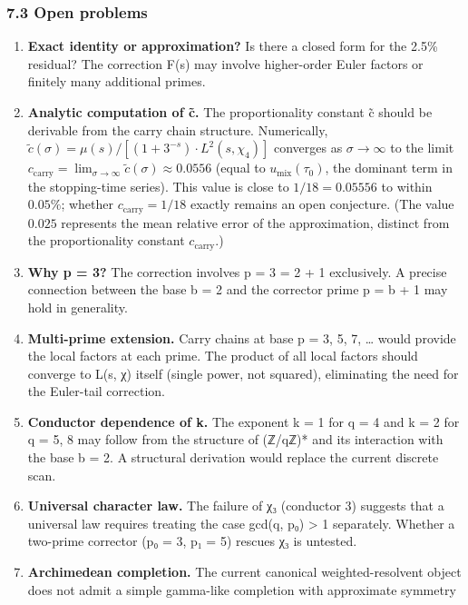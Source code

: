 \documentclass[
  11pt,
]{article}
\begin{document}
\subsubsection{7.3 Open problems}\label{open-problems}

\begin{enumerate}
\def\labelenumi{\arabic{enumi}.}
\item
  \textbf{Exact identity or approximation?} Is there a closed form for the 2.5\%
  residual? The correction F(s) may involve higher-order Euler factors or
  finitely many additional primes.
\item
  \textbf{Analytic computation of c̃.} The proportionality constant c̃ should be
  derivable from the carry chain structure. Numerically,
  \(\tilde{c}(\sigma) = \mu(s)/[(1+3^{-s}) \cdot L^2(s,\chi_4)]\) converges as
  \(\sigma \to \infty\) to the limit
  \(c_{\mathrm{carry}} = \lim_{\sigma\to\infty} \tilde{c}(\sigma) \approx 0.0556\)
  (equal to \(u_{\mathrm{mix}}(\tau_0)\), the dominant term in the stopping-time
  series). This value is close to \(1/18 = 0.05556\) to within \(0.05\%\);
  whether \(c_{\mathrm{carry}} = 1/18\) exactly remains an open conjecture. (The
  value \(0.025\) represents the mean relative error of the approximation,
  distinct from the proportionality constant \(c_{\mathrm{carry}}\).)
\item
  \textbf{Why p = 3?} The correction involves p = 3 = 2 + 1 exclusively. A
  precise connection between the base b = 2 and the corrector prime p = b + 1
  may hold in generality.
\item
  \textbf{Multi-prime extension.} Carry chains at base p = 3, 5, 7, \ldots{}
  would provide the local factors at each prime. The product of all local
  factors should converge to L(s, χ) itself (single power, not squared),
  eliminating the need for the Euler-tail correction.
\item
  \textbf{Conductor dependence of k.} The exponent k = 1 for q = 4 and k = 2 for
  q = 5, 8 may follow from the structure of (ℤ/qℤ)* and its interaction with the
  base b = 2. A structural derivation would replace the current discrete scan.
\item
  \textbf{Universal character law.} The failure of χ₃ (conductor 3) suggests
  that a universal law requires treating the case gcd(q, p₀) \textgreater{} 1
  separately. Whether a two-prime corrector (p₀ = 3, p₁ = 5) rescues χ₃ is
  untested.
\item
  \textbf{Archimedean completion.} The current canonical weighted-resolvent
  object does not admit a simple gamma-like completion with approximate symmetry

\end{enumerate}
\end{document}
